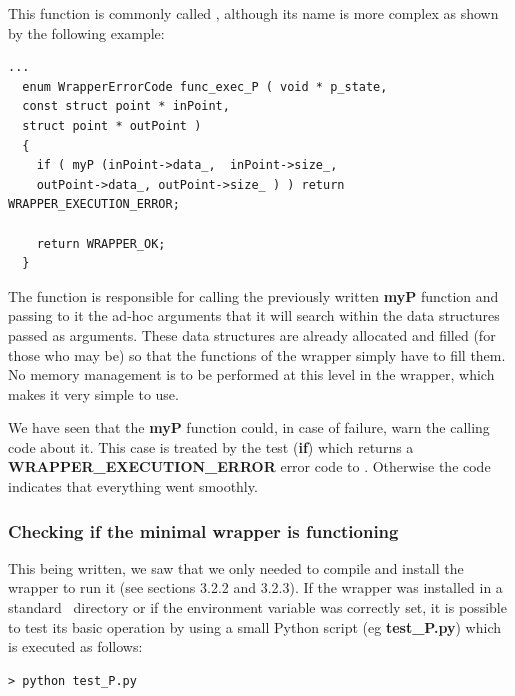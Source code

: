 This function is commonly called , although its name is more complex as shown by the following example:

\lstset{language=C, basicstyle=\normalsize}
\begin{lstlisting}[frame=TBRL]
  ...
  enum WrapperErrorCode func_exec_P ( void * p_state,
  const struct point * inPoint,
  struct point * outPoint )
  {
    if ( myP (inPoint->data_,  inPoint->size_,
    outPoint->data_, outPoint->size_ ) ) return WRAPPER_EXECUTION_ERROR;

    return WRAPPER_OK;
  }
\end{lstlisting}

The  function is responsible for calling the previously written {\bf myP} function and passing to it the ad-hoc arguments that it will search within the data structures passed as arguments. These data structures are already allocated and filled (for those who may be) so that the functions of the wrapper simply have to fill them. No memory management is to be performed at this level in the wrapper, which makes it very simple to use.

We have seen that the {\bf myP} function could, in case of failure, warn the calling code about it. This case is treated by the test ({\bf if}) which returns a {\bf WRAPPER\_EXECUTION\_ERROR} error code to \OT. Otherwise the  code indicates that everything went smoothly.

\subsubsection{Checking if the minimal wrapper is functioning}

This being written, we saw that we only needed to compile and install the wrapper to run it (see sections 3.2.2 and 3.2.3). If the wrapper was installed in a standard \OT\ directory or if the  environment variable was correctly set, it is possible to test its basic operation by using a small Python script (eg {\bf test\_P.py}) which is executed as follows:

\lstset{language=Bash, basicstyle=\normalsize}
\begin{lstlisting}[frame=TBRL]
  > python test_P.py
\end{lstlisting}

